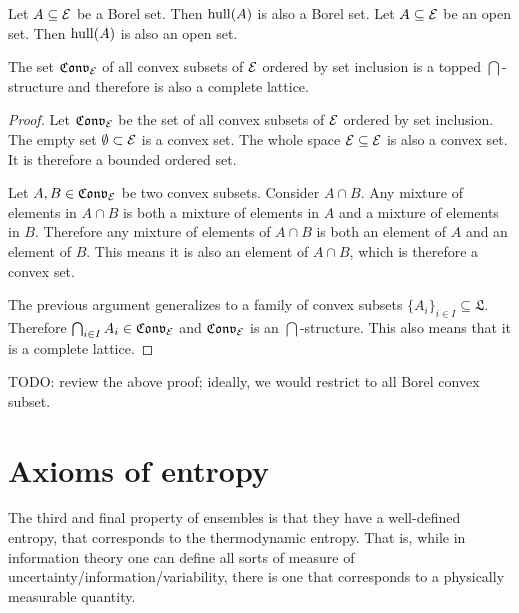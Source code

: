 \begin{conj}
	Let $A \subseteq \mathcal{E}$ be a Borel set. Then $\mathrm{hull}(A)$ is also a Borel set. Let $A \subseteq \mathcal{E}$ be an open set. Then $\mathrm{hull}(A)$ is also an open set.
\end{conj}


\begin{coro}
	The set $\mathfrak{Conv}_{\mathcal{E}}$ of all convex subsets of $\mathcal{E}$ ordered by set inclusion is a topped $\bigcap$-structure and therefore is also a complete lattice.
\end{coro}

\begin{proof}
	Let $\mathfrak{Conv}_{\mathcal{E}}$ be the set of all convex subsets of $\mathcal{E}$ ordered by set inclusion. The empty set $\emptyset \subset \mathcal{E}$ is a convex set. The whole space $\mathcal{E} \subseteq \mathcal{E}$ is also a convex set. It is therefore a bounded ordered set.
	
	Let $A, B \in \mathfrak{Conv}_{\mathcal{E}}$ be two convex subsets. Consider $A \cap B$. Any mixture of elements in $A \cap B$ is both a mixture of elements in $A$ and a mixture of elements in $B$. Therefore any mixture of elements of $A \cap B$ is both an element of $A$ and an element of $B$. This means it is also an element of $A \cap B$, which is therefore a convex set.
	
	The previous argument generalizes to a family of convex subsets $\{A_i\}_{i \in I} \subseteq \mathfrak{L}$. Therefore $\bigcap_{i \in I} A_i \in \mathfrak{Conv}_{\mathcal{E}}$ and $\mathfrak{Conv}_{\mathcal{E}}$ is an $\bigcap$-structure. This also means that it is a complete lattice.
\end{proof}

TODO: review the above proof; ideally, we would restrict to all Borel convex subset.

\section{Axioms of entropy}


The third and final property of ensembles is that they have a well-defined entropy, that corresponds to the thermodynamic entropy. That is, while in information theory one can define all sorts of measure of uncertainty/information/variability, there is one that corresponds to a physically measurable quantity.

